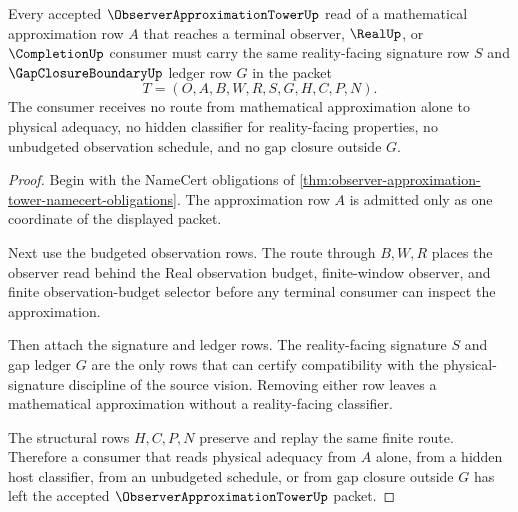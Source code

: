 \begin{theorem}
\label{thm:observer-approximation-tower-gap-ledger-nonescape}
Every accepted $\ObserverApproximationTowerUp$ read of a mathematical approximation row $A$ that reaches a terminal observer, $\RealUp$, or $\CompletionUp$ consumer must carry the same reality-facing signature row $S$ and $\GapClosureBoundaryUp$ ledger row $G$ in the packet
$$
T=(O,A,B,W,R,S,G,H,C,P,N).
$$
The consumer receives no route from mathematical approximation alone to physical adequacy, no hidden classifier for reality-facing properties, no unbudgeted observation schedule, and no gap closure outside $G$.
\end{theorem}
\begin{proof}
Begin with the NameCert obligations of \autoref{thm:observer-approximation-tower-namecert-obligations}. The approximation row $A$ is admitted only as one coordinate of the displayed packet.

Next use the budgeted observation rows. The route through $B,W,R$ places the observer read behind the Real observation budget, finite-window observer, and finite observation-budget selector before any terminal consumer can inspect the approximation.

Then attach the signature and ledger rows. The reality-facing signature $S$ and gap ledger $G$ are the only rows that can certify compatibility with the physical-signature discipline of the source vision. Removing either row leaves a mathematical approximation without a reality-facing classifier.

The structural rows $H,C,P,N$ preserve and replay the same finite route. Therefore a consumer that reads physical adequacy from $A$ alone, from a hidden host classifier, from an unbudgeted schedule, or from gap closure outside $G$ has left the accepted $\ObserverApproximationTowerUp$ packet.
\end{proof}

